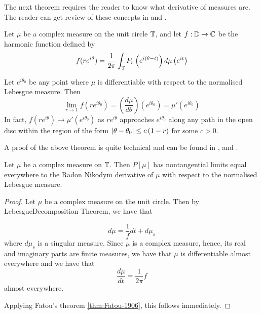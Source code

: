 The next theorem requires the reader to know what derivative of measures are. The reader can get review of these concepts in \cite{rudin1987real} and \cite{cohn2013measure}.

\begin{theorem}[Fatou (1905)]
    Let $\mu$ be a complex measure on the unit circle $\mathbb T$, and let $f: \mathbb D \to \mathbb C$ be the harmonic function defined by
    \begin{align*}
	f(re^{i\theta}) = \frac{1}{2\pi} \int_{\mathbb T} P_{r} \left( e^{i\left( \theta-t \right)} \right) d\mu \left( e^{it} \right)
    \end{align*}

    Let $e^{i\theta_{0}}$ be any point where $\mu$ is differentiable with respect to the normalised Lebesgue measure. Then
    \begin{equation*}
	\lim_{r\to 1} f\left( re^{i\theta_{0}} \right) = \left( \frac{d\mu}{d\theta} \right) \left( e^{i\theta _{0}} \right) = \mu ' \left( e^{i\theta _{0}} \right)
    \end{equation*}
    In fact, $f(re^{i\theta}) \to \mu ' \left( e^{i\theta_{0}} \right)$ as $re^{i\theta}$ approaches $e^{i\theta_{0}}$ along any path in the open disc within the region of the form $\left\lvert \theta - \theta_{0} \right\rvert \le c \left( 1-r \right)$ for some $c> 0$. 
    \label{thm:Fatou-1906}
\end{theorem}

A proof of the above theorem is quite technical and can be found in \cite{koosis1998introduction}, \cite{hoffman2007banach} and \cite{axler2013harmonic}.

\begin{corollary}
    Let $\mu$ be a complex measure on $\mathbb T$. Then $P[\mu]$ has nontangential limits equal everywhere to the Radon Nikodym derivative of $\mu$ with respect to the normalised Lebesgue measure.
\end{corollary}
\begin{proof}
    Let $\mu$ be a complex measure on the unit circle. Then by LebesgueDecomposition Theorem, we have that

    \begin{equation*}
	d\mu = \frac{1}{f} dt + d\mu_{s}
    \end{equation*}
    where $d\mu_{s}$ is a singular measure. 
    Since $\mu$ is a complex measure, hence, its real and imaginary parts are finite measures, we have that $\mu$ is differentiable almost everywhere and we have that
    \begin{equation*}
	\frac{d\mu}{dt} = \frac{1}{2\pi}f
    \end{equation*}
    almost everywhere.

    Applying Fatou's theorem \ref{thm:Fatou-1906}, this follows immediately.
\end{proof}

